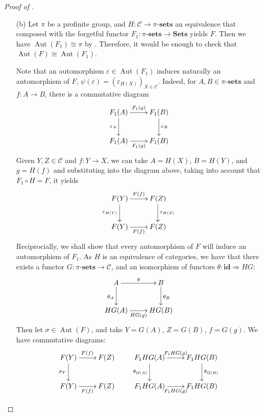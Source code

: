 \documentclass[10pt]{article}
\theoremstyle{thmstyle}
\theoremstyle{defstyle}
\newcommand{\catSets}{\mathbf{Sets}}
\newcommand{\sets}[1]{#1\text{-}\mathbf{sets}}
\newcommand{\Aut}{\operatorname{Aut}}
\newcommand{\id}{\mathbf{id}}
\newcommand{\scrC}{\mathscr{C}} %
\begin{document}
\begin{proof}[Proof of ]
\begin{enumerate}
\item[(b)] Let $\pi$ be a profinite group, and $H:\scrC\to\sets{\pi}$ an equivalence that composed with the forgetful functor $F_1: \sets{\pi}\to\catSets$ yields $F$. Then we have $\Aut(F_1)\cong\pi$ by . Therefore, it would be enough to check that $\Aut(F)\cong\Aut(F_1)$.

Note that an automorphism $\varepsilon\in\Aut(F_1)$ induces naturally an automorphism of $F$, $\psi(\varepsilon) = \left(\varepsilon_{H(X)}\right)_{X\in\scrC}$. Indeed, for $A, B\in\sets{\pi}$ and $f: A\to B$, there is a commutative diagram 
\begin{equation*}
    \xymatrix {
        F_1(A)\ar[r]^{F_1(g)}\ar[d]_{\varepsilon_A} & F_1(B)\ar[d]^{\varepsilon_B}\\
        F_1(A)\ar[r]_{F_1(g)} & F_1(B)
    }
\end{equation*}
Given $Y, Z\in\scrC$ and $f: Y\to X$, we can take $A = H(X)$, $B = H(Y)$, and $g = H(f)$ and substituting into the diagram above, taking into account that $F_1\circ H = F$, it yields 
\begin{equation*}
    \xymatrix {
        F(Y)\ar[r]^{F(f)}\ar[d]_{\varepsilon_{H(Y)}} & F(Z)\ar[d]^{\varepsilon_{H(Z)}}\\
        F(Y)\ar[r]_{F(f)} & F(Z)
    }
\end{equation*}
Reciprocially, we shall show that every automorphism of $F$ will induce an automorphism of $F_1$. As $H$ is an equivalence of categories, we have that there exists a functor $G:\sets{\pi}\to\scrC$, and an isomorphism of functors $\theta: \id\Rightarrow HG$: 
\begin{equation*}
    \xymatrix {
        A\ar[r]^g\ar[d]_{\theta_A} & B\ar[d]^{\theta_B}\\
        HG(A)\ar[r]_{HG(g)} & HG(B)
    }
\end{equation*}
Then let $\sigma\in\Aut(F)$, and take $Y = G(A)$, $Z = G(B)$, $f = G(g)$. We have commutative diagrams: 
\begin{equation*}
    \xymatrix {
        F(Y)\ar[r]^{F(f)}\ar[d]_{\sigma_Y} & F(Z)\\
        F(Y)\ar[r]_{F(f)} & F(Z)
    }
    \qquad
    \xymatrix {
        F_1HG(A)\ar[r]^{F_1HG(g)}\ar[d]_{\theta_{G(A)}} & F_1HG(B)\ar[d]^{\theta_{G(B)}}\\
        F_1HG(A)\ar[r]_{F_1HG(g)} & F_1HG(B)
}
\end{equation*}
\end{enumerate}
\end{proof}
\end{document}
